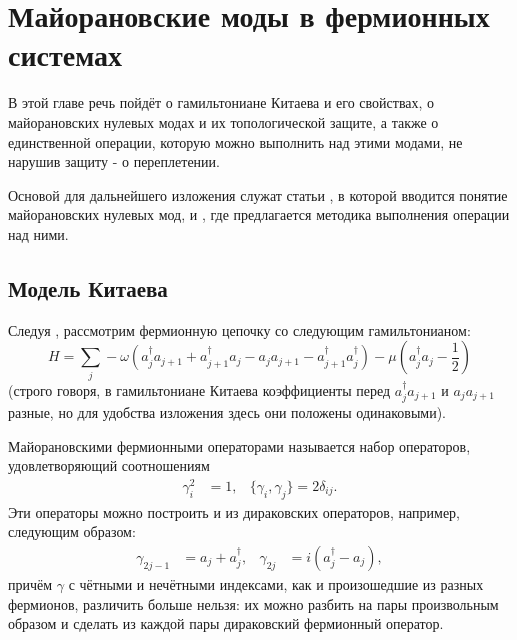 \documentclass[a4paper,12pt]{article}
\theoremstyle{plain} %
\theoremstyle{definition} %
\theoremstyle{remark} %
\begin{document}

\pagebreak

\section{Майорановские моды в фермионных системах} \label{sec:majorana_modes}

В этой главе речь пойдёт о гамильтониане Китаева и его свойствах, о майорановских нулевых модах и их топологической защите, а также о единственной операции, которую можно выполнить над этими модами, не нарушив защиту - о переплетении.

Основой для дальнейшего изложения служат статьи \cite{kitaev}, в которой вводится понятие майорановских нулевых мод, и \cite{braiding}, где предлагается методика выполнения операции над ними. 

\subsection{Модель Китаева} \label{subsec:kitaev}
Следуя \cite{kitaev}, рассмотрим фермионную цепочку со следующим гамильтонианом:
\begin{equation}
    H = \sum\limits_j -\omega \left( a_j^\dagger a_{j+1} + a_{j+1}^\dagger a_j - a_j a_{j+1} - a_{j+1}^\dagger a_j^\dagger \right) - \mu \left( a_j^\dagger a_j - \frac{1}{2} \right)
    \label{eq:main_hamiltonian_fermi}
\end{equation}
(строго говоря, в гамильтониане Китаева коэффициенты перед $a_j^\dagger a_{j+1}$ и $a_j a_{j+1}$ разные, но для удобства изложения здесь они положены одинаковыми).

Майорановскими фермионными операторами называется набор операторов, удовлетворяющий соотношениям
\begin{align}
\gamma_i^2 &= 1, & \{\gamma_i, \gamma_j\} = 2 \delta_{ij}.
\end{align}
Эти операторы можно построить и из дираковских операторов, например, следующим образом:
\begin{align}
\gamma_{2j-1} &= a_j + a_j^\dagger, & \gamma_{2j} &= i\left( a_j^\dagger - a_j \right),
\end{align}
причём $\gamma$ с чётными и нечётными индексами, как и произошедшие из разных фермионов, различить больше нельзя: их можно разбить на пары произвольным образом и сделать из каждой пары дираковский фермионный оператор.
\end{document}
